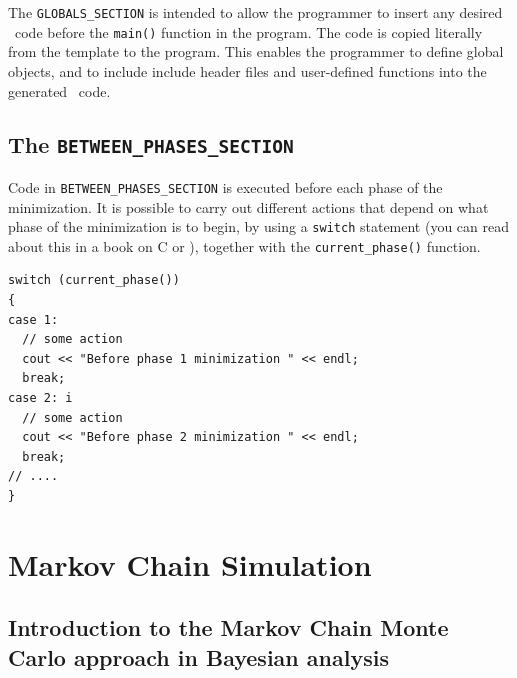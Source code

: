 \documentclass{admbmanual}
\begin{document}
The \texttt{GLOBALS\_SECTION} is intended to allow the programmer to insert any
desired \cplus\ code before the \texttt{main()} function in the program. The
code is copied literally from the template to the program. This enables the
programmer to define global objects, and to include include header files and
user-defined functions into the generated \cplus\ code.


\section{The \texttt{BETWEEN\_PHASES\_SECTION}}

Code in \texttt{BETWEEN\_PHASES\_SECTION} is executed before each phase of the
minimization. It is possible to carry out different actions that depend on what
phase of the minimization is to begin, by using a \texttt{switch} statement (you
can read about this in a book on C or \cplus), together with the
\texttt{current\_phase()} function.
\begin{lstlisting}
switch (current_phase())
{
case 1:
  // some action
  cout << "Before phase 1 minimization " << endl;
  break;
case 2: i
  // some action
  cout << "Before phase 2 minimization " << endl;
  break;
// ....
}
\end{lstlisting}


\chapter{Markov Chain Simulation}

\section{Introduction to the Markov Chain Monte Carlo\br
  approach in Bayesian analysis}
\end{document}

